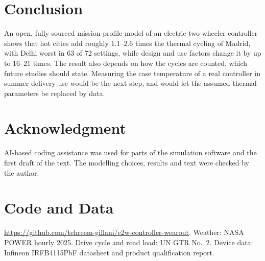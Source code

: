 \documentclass[conference]{IEEEtran}
\begin{document}
\section{Conclusion}
An open, fully sourced mission-profile model of an electric two-wheeler
controller shows that hot cities add roughly 1.1--2.6 times the thermal
cycling of Madrid, with Delhi worst in 63 of 72 settings, while design and use
factors change it by up to 16--21 times. The result also depends on how the
cycles are counted, which future studies should state. Measuring the case
temperature of a real controller in summer delivery use would be the next
step, and would let the assumed thermal parameters be replaced by data.

\section*{Acknowledgment}
AI-based coding assistance was used for parts of the simulation software and
the first draft of the text. The modelling choices, results and text were
checked by the author.

\section*{Code and Data}
\url{https://github.com/tehreem-gillani/e2w-controller-wearout}. Weather:
NASA POWER hourly 2025. Drive cycle and road load: UN GTR No.~2. Device data:
Infineon IRFB4115PbF datasheet and product qualification report.
\end{document}
